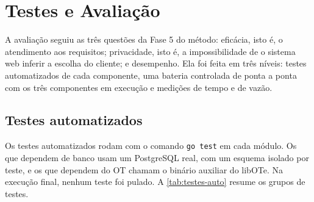 
\section{Testes e Avaliação}\label{sec:testes}

A avaliação seguiu as três questões da Fase 5 do método: eficácia, isto é, o
atendimento aos requisitos; privacidade, isto é, a impossibilidade de o sistema
web inferir a escolha do cliente; e desempenho. Ela foi feita em três níveis:
testes automatizados de cada componente, uma bateria controlada de ponta a
ponta com os três componentes em execução e medições de tempo e de vazão.

\subsection{Testes automatizados}

Os testes automatizados rodam com o comando \texttt{go test} em cada módulo. Os
que dependem de banco usam um PostgreSQL real, com um esquema isolado por
teste, e os que dependem do OT chamam o binário auxiliar do libOTe. Na execução
final, nenhum teste foi pulado. A \autoref{tab:testes-auto} resume os grupos de
testes.

